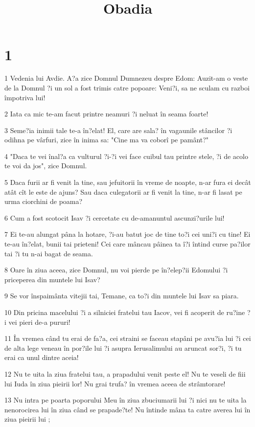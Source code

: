

\title{Obadia}


\chapter{1}

\par 1 Vedenia lui Avdie. A?a zice Domnul Dumnezeu despre Edom: Auzit-am o veste de la Domnul ?i un sol a fost trimis catre popoare: Veni?i, sa ne sculam cu razboi împotriva lui!
\par 2 Iata ca mic te-am facut printre neamuri ?i neluat în seama foarte!
\par 3 Seme?ia inimii tale te-a în?elat! El, care are sala? în vagaunile stâncilor ?i odihna pe vârfuri, zice în inima sa: "Cine ma va coborî pe pamânt?"
\par 4 "Daca te vei înal?a ca vulturul ?i-?i vei face cuibul tau printre stele, ?i de acolo te voi da jos", zice Domnul.
\par 5 Daca furii ar fi venit la tine, sau jefuitorii în vreme de noapte, n-ar fura ei decât atât cît le este de ajuns? Sau daca culegatorii ar fi venit la tine, n-ar fi lasat pe urma ciorchini de poama?
\par 6 Cum a fost scotocit Isav ?i cercetate cu de-amanuntul ascunzi?urile lui!
\par 7 Ei te-au alungat pâna la hotare, ?i-au batut joc de tine to?i cei uni?i cu tine! Ei te-au în?elat, bunii tai prieteni! Cei care mâncau pâinea ta î?i întind curse pa?ilor tai ?i tu n-ai bagat de seama.
\par 8 Oare în ziua aceea, zice Domnul, nu voi pierde pe în?elep?ii Edomului ?i priceperea din muntele lui Isav?
\par 9 Se vor înspaimânta vitejii tai, Temane, ca to?i din muntele lui Isav sa piara.
\par 10 Din pricina macelului ?i a silniciei fratelui tau Iacov, vei fi acoperit de ru?ine ?i vei pieri de-a pururi!
\par 11 În vremea când tu erai de fa?a, cei straini se faceau stapâni pe avu?ia lui ?i cei de alta lege veneau în por?ile lui ?i asupra Ierusalimului au aruncat sor?i, ?i tu erai ca unul dintre aceia!
\par 12 Nu te uita la ziua fratelui tau, a prapadului venit peste el! Nu te veseli de fiii lui Iuda în ziua pieirii lor! Nu grai trufa? în vremea aceea de strâmtorare!
\par 13 Nu intra pe poarta poporului Meu în ziua zbuciumarii lui ?i nici nu te uita la nenorocirea lui în ziua când se prapade?te! Nu întinde mâna ta catre averea lui în ziua pieirii lui ;
